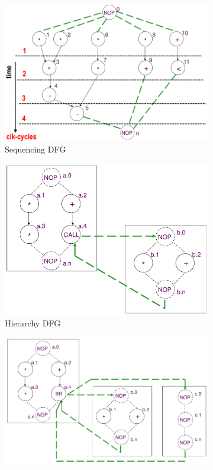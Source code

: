 \begin{figure}[H]
    \centering
    \begin{subfigure}[b]{0.2\textwidth}
        \includegraphics[width=\textwidth]{./Cap2/Images/Image09.png}
        \caption{Sequencing DFG}
        \label{fig:SequencingDFG}
    \end{subfigure}
    \quad
    \begin{subfigure}[b]{0.2\textwidth}
        \includegraphics[width=\textwidth]{./Cap2/Images/Image10.png}
        \caption{Hierarchy DFG}
        \label{fig:HierarchyDFG}
    \end{subfigure}
    \quad
    \begin{subfigure}[b]{0.2\textwidth}
        \includegraphics[width=\textwidth]{./Cap2/Images/Image11.png}

\end{subfigure}
\end{figure}
